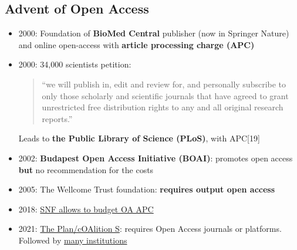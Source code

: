 \documentclass[10pt,compress,serif,aspectratio=169]{beamer}
\begin{document}

 \subsection{Advent of Open Access}

 \begin{frame}[t]%
 \vskip1cm%
\begin{itemize}

\item 2000: Foundation of \textbf{BioMed Central} publisher (now in Springer Nature) and online open-access with \textbf{article processing charge (APC)}
\item 2000: 34,000 scientists petition:
  \begin{quote}
    “we will publish in, edit and review for, and personally subscribe to only those scholarly and scientific journals that have agreed to grant unrestricted free distribution rights to any and all original research reports.”
  \end{quote}
  Leads to \textbf{the Public Library of Science (PLoS)}, with APC[19]

  \item 2002: \textbf{Budapest Open Access Initiative (BOAI)}: promotes open access \textbf{but} no recommendation for the costs
  \item 2005: The Wellcome Trust foundation: \textbf{requires output open access}
  \item 2018: \href{https://www.snf.ch/en/bQ17hb9mM1NC4awy/news/news-181010-make-open-access-the-new-normal}{SNF allows to budget OA APC}
  \item 2021: \href{https://www.coalition-s.org/}{The Plan/cOAlition S}: requires Open Access journals or platforms. Followed by \href{https://www.coalition-s.org/supporters/}{many institutions}
 \end{itemize}
\end{frame}
\end{document}
